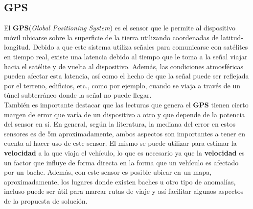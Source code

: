 	\subsection{GPS}
		El \textbf{GPS}(\emph{Global Positioning System}) es el sensor que le permite al dispositivo móvil ubicarse sobre la
		superficie de la tierra utilizando coordenadas de latitud-longitud. Debido a que este sistema utiliza señales para
		comunicarse con satélites en tiempo real, existe una latencia debido al tiempo que le toma a la señal viajar hacia el
		satélite y de vuelta al dispositivo. Además, las condiciones atmosféricas pueden afectar esta latencia, así como el hecho
		de que la señal puede ser reflejada por el terreno, edificios, etc., como por ejemplo, cuando se viaja a través de un
		túnel subterráneo donde la señal no puede llegar.\\
		\indent También es importante destacar que las lecturas que genera el \textbf {GPS} tienen cierto margen de error que varía
		de un dispositivo a otro y que depende de la potencia del sensor en sí. En general, según la literatura, la mediana del error
		en estos sensores es de 5m aproximadamente, ambos aspectos son importantes a tener en cuenta
		al hacer uso de este sensor. El mismo se puede utilizar para estimar la \textbf{velocidad} a la que viaja el vehículo, lo que
		es necesario ya que la \textbf{velocidad} es un factor que influye de forma directa en la forma que un vehículo es afectado por
		un bache. Además, con este sensor es posible ubicar en un mapa, aproximadamente, los lugares donde existen baches u otro tipo
		de anomalías, incluso puede ser útil para marcar rutas de viaje y así facilitar algunos aspectos de la propuesta de solución.

